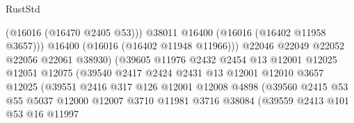 \begin{lexlean}{RustStd}
\begin{coremodule}
                                            (@16016 (@16470 @2405 @53)))
                                          @38011
                                          @16400
                                          (@16016 (@16402 @11958 @3657)))
                                        @16400
                                        (@16016 (@16402 @11948 @11966)))
                                      @22046
                                      @22049
                                      @22052
                                      @22056
                                      @22061
                                      @38930)
                                    (@39605
                                      @11976
                                      @2432
                                      @2454
                                      @13
                                      @12001
                                      @12025
                                      @12051
                                      @12075
                                      (@39540
                                        @2417
                                        @2424
                                        @2431
                                        @13
                                        @12001
                                        @12010
                                        @3657
                                        @12025
                                        (@39551
                                          @2416
                                          @317
                                          @126
                                          @12001
                                          @12008
                                          @4898
                                          (@39560
                                            @2415
                                            @53
                                            @55
                                            @5037
                                            @12000
                                            @12007
                                            @3710
                                            @11981
                                            @3716
                                            @38084
                                            (@39559
                                              @2413
                                              @101
                                              @53
                                              @16
                                              @11997

\end{coremodule}
\end{lexlean}
